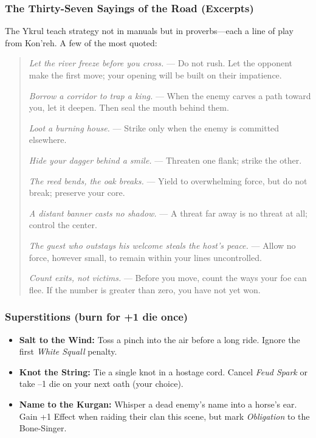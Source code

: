 \subsubsection{The Thirty-Seven Sayings of the Road (Excerpts)}
\label{sec:ykrul-sayings}

The Ykrul teach strategy not in manuals but in proverbs---each a line of play from Kon'reh. A few of the most quoted:

\begin{quote}
\textit{Let the river freeze before you cross.} --- Do not rush. Let the opponent make the first move; your opening will be built on their impatience.

\textit{Borrow a corridor to trap a king.} --- When the enemy carves a path toward you, let it deepen. Then seal the mouth behind them.

\textit{Loot a burning house.} --- Strike only when the enemy is committed elsewhere.

\textit{Hide your dagger behind a smile.} --- Threaten one flank; strike the other.

\textit{The reed bends, the oak breaks.} --- Yield to overwhelming force, but do not break; preserve your core.

\textit{A distant banner casts no shadow.} --- A threat far away is no threat at all; control the center.

\textit{The guest who outstays his welcome steals the host's peace.} --- Allow no force, however small, to remain within your lines uncontrolled.

\textit{Count exits, not victims.} --- Before you move, count the ways your foe can flee. If the number is greater than zero, you have not yet won.
\end{quote}

\subsubsection{Superstitions (burn for +1 die once)}

\begin{itemize}[nosep]
  \item \textbf{Salt to the Wind:} Toss a pinch into the air before a long ride. Ignore the first \emph{White Squall} penalty.
  \item \textbf{Knot the String:} Tie a single knot in a hostage cord. Cancel \emph{Feud Spark} or take --1 die on your next oath (your choice).
  \item \textbf{Name to the Kurgan:} Whisper a dead enemy's name into a horse's ear. Gain +1 Effect when raiding their clan this scene, but mark \emph{Obligation} to the Bone-Singer.
\end{itemize}

